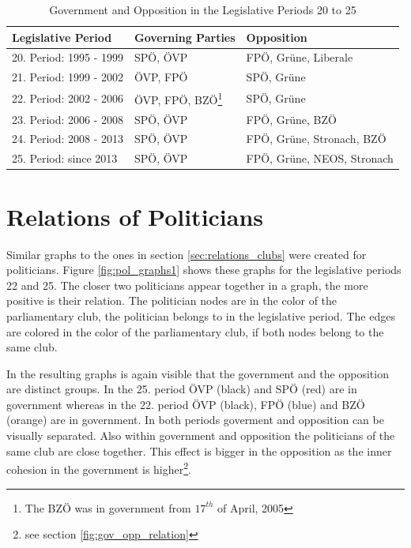 \begin{table}

\centering
\bgroup
\def\arraystretch{1.2}
\begin{tabular}{| p{4cm} | p{3cm} | l |}
\hline
  Legislative Period & Governing Parties & Opposition  \\
\hline
\hline
  20. Period: 1995 - 1999 & SPÖ, ÖVP & FPÖ, Grüne, Liberale \\
\hline
  21. Period: 1999 - 2002 & ÖVP, FPÖ & SPÖ, Grüne \\
\hline
  22. Period: 2002 - 2006 & ÖVP, FPÖ, BZÖ\footnote{The BZÖ was in government from $17^{th}$ of April, 2005} & SPÖ, Grüne \\
\hline
  23. Period: 2006 - 2008 & SPÖ, ÖVP & FPÖ, Grüne, BZÖ \\
\hline
  24. Period: 2008 - 2013 & SPÖ, ÖVP & FPÖ, Grüne, Stronach, BZÖ \\
\hline
  25. Period: since 2013 & SPÖ, ÖVP & FPÖ, Grüne, NEOS, Stronach \\
\hline

\end{tabular}
\egroup
\caption{Government and Opposition in the Legislative Periods 20 to 25}
\label{table:gov_opp_parties}
\end{table}


\section{Relations of Politicians}
\label{sec:relations_pol}
Similar graphs to the ones in section \ref{sec:relations_clubs} were created for politicians. Figure \ref{fig:pol_graphs1} shows these graphs for the legislative periods 22 and 25. The closer two politicians appear together in a graph, the more positive is their relation. The politician nodes are in the color of the parliamentary club, the politician belongs to in the legislative period. The edges are colored in the color of the parliamentary club, if both nodes belong to the same club.

In the resulting graphs is again visible that the government and the opposition are distinct groups. In the 25. period ÖVP (black) and SPÖ (red) are in government whereas in the 22. period ÖVP (black), FPÖ (blue) and BZÖ (orange) are in government. In both periods goverment and opposition can be visually separated. Also within government and opposition the politicians of the same club are close together. This effect is bigger in the opposition as the inner cohesion in the government is higher\footnote{see section \ref{fig:gov_opp_relation}}.

